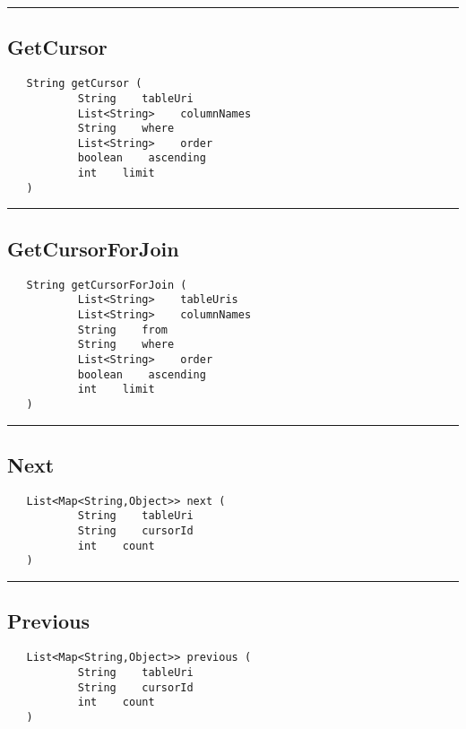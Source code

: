 \rule{15cm}{2pt}
\subsection{GetCursor}
\label{Api:GetCursor}
\begin{verbatim}
   String getCursor (
           String    tableUri
           List<String>    columnNames
           String    where
           List<String>    order
           boolean    ascending
           int    limit
   )
\end{verbatim}



\rule{15cm}{2pt}
\subsection{GetCursorForJoin}
\label{Api:GetCursorForJoin}
\begin{verbatim}
   String getCursorForJoin (
           List<String>    tableUris
           List<String>    columnNames
           String    from
           String    where
           List<String>    order
           boolean    ascending
           int    limit
   )
\end{verbatim}



\rule{15cm}{2pt}
\subsection{Next}
\label{Api:Next}
\begin{verbatim}
   List<Map<String,Object>> next (
           String    tableUri
           String    cursorId
           int    count
   )
\end{verbatim}



\rule{15cm}{2pt}
\subsection{Previous}
\label{Api:Previous}
\begin{verbatim}
   List<Map<String,Object>> previous (
           String    tableUri
           String    cursorId
           int    count
   )
\end{verbatim}



